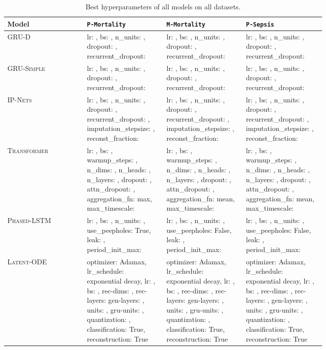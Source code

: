 \documentclass{article}
\newcommand{\dataset}[1]{\texttt{#1}}
\newcommand{\method}[1]{\textsc{#1}}
\begin{document}
\begin{table*}
    \caption{Best hyperparameters of all models on all datasets.} \label{tab:selected hyperparameters}
    \begin{tabularx}{\linewidth}{Xp{0.25\linewidth}p{0.25\linewidth}p{0.25\linewidth}}
\toprule
\textbf{Model} & \dataset{P-Mortality} & \dataset{M-Mortality} & \dataset{P-Sepsis} \\
\midrule
\method{GRU-D} & 
    lr: , bs: , n\_units: , dropout: , recurrent\_dropout:  &
    lr: , bs: , n\_units: , dropout: , recurrent\_dropout:  &
    lr: , bs: , n\_units: , dropout: , recurrent\_dropout:  \\
\midrule
\method{GRU-Simple} &
    lr: , bs: , n\_units: , dropout: , recurrent\_dropout:  &
    lr: , bs: , n\_units: , dropout: , recurrent\_dropout:  &
    lr: , bs: , n\_units: , dropout: , recurrent\_dropout:  \\
\midrule
\method{IP-Nets}    &
    lr: , bs: , n\_units: , dropout: , recurrent\_dropout: , imputation\_stepsize: , reconst\_fraction:  &
    lr: , bs: , n\_units: , dropout: , recurrent\_dropout: , imputation\_stepsize: , reconst\_fraction:  &
    lr: , bs: , n\_units: , dropout: , recurrent\_dropout: , imputation\_stepsize: , reconst\_fraction:  \\
\midrule
\method{Transformer} & 
    lr: , bs: , warmup\_steps: , n\_dims: , n\_heads: , n\_layers: , dropout: , attn\_dropout: , aggregation\_fn: max, max\_timescale:  &
    lr: , bs: , warmup\_steps: , n\_dims: , n\_heads: , n\_layers: , dropout: , attn\_dropout: , aggregation\_fn: mean, max\_timescale:  &
    lr: , bs: , warmup\_steps: , n\_dims: , n\_heads: , n\_layers: , dropout: , attn\_dropout: , aggregation\_fn: mean, max\_timescale:  \\
\midrule
\method{Phased-LSTM} &
    lr: , bs: , n\_units: , use\_peepholes: True, leak: , period\_init\_max:  &
    lr: , bs: , n\_units: , use\_peepholes: False, leak: , period\_init\_max:  &
    lr: , bs: , n\_units: , use\_peepholes: False, leak: , period\_init\_max:  \\
\midrule
\method{Latent-ODE} & 
    optimizer: Adamax, lr\_schedule: exponential decay, lr: , bs: , rec-dims: , rec-layers:  gen-layers: , units: , gru-units: , quantization: , classification: True, reconstruction: True &
    optimizer: Adamax, lr\_schedule: exponential decay, lr: , bs: , rec-dims: , rec-layers:  gen-layers: , units: , gru-units: , quantization: , classification: True, reconstruction: True &
    optimizer: Adamax, lr\_schedule: exponential decay, lr: , bs: , rec-dims: , rec-layers: , gen-layers: , units: , gru-units: , quantization: , classification: True, reconstruction: True \\

\end{tabularx}
\end{table*}
\end{document}
